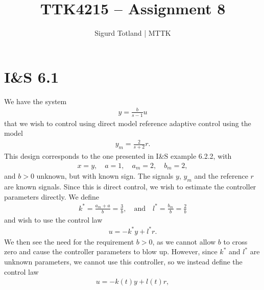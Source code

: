 \documentclass[]{article}
\title{TTK4215 – Assignment 8}
\author{Sigurd Totland | MTTK}
\begin{document}
\maketitle

\section{I\&S 6.1}
We have the system
\begin{equation}\begin{aligned}
y = \frac{b}{s-1}u
\end{aligned}\end{equation}
that we wish to control using direct model reference adaptive control using the model
\begin{equation}\begin{aligned}
y_m = \frac{2}{s+2}r.
\end{aligned}\end{equation}
This design corresponds to the one presented in I\&S example 6.2.2, with
\begin{equation}\begin{aligned}
x=y, \quad a = 1, \quad a_m = 2, \quad b_m = 2,
\end{aligned}\end{equation}
and $b > 0$ unknown, but with known sign. The signals $y$, $y_m$ and the reference $r$ are known signals. Since this is direct control, we wish to estimate the controller parameters directly. We define
\begin{equation}\begin{aligned}
k^* = \frac{a_m + a}{b} = \frac{3}{b}, \quad \text{and} \quad
l^* = \frac{b_m}{b} = \frac{2}{b}
\end{aligned}\end{equation}
and wish to use the control law
\begin{equation}\begin{aligned}
u = -k^*y + l^* r.
\end{aligned}\end{equation}
We then see the need for the requirement $b > 0$, as we cannot allow $b$ to cross zero and cause the controller parameters to blow up. However, since $k^*$ and $l^*$ are unknown parameters, we cannot use this controller, so we instead define the control law
\begin{equation}\begin{aligned}
u = -k(t)y + l(t) r,
\end{aligned}\end{equation}
\end{document}

